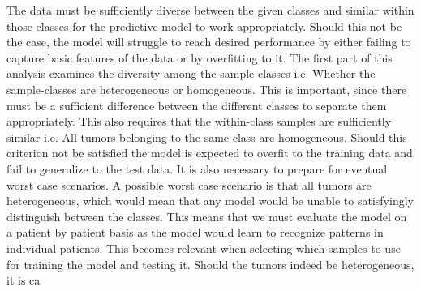 The data must be sufficiently diverse between the given classes and similar within those classes for the predictive model to work appropriately. Should this not be the case, the model will struggle to reach desired performance by either failing to capture basic features of the data or by overfitting to it. The first part of this analysis examines the diversity among the sample-classes i.e. Whether the sample-classes are heterogeneous or homogeneous. This is important, since there must be a sufficient difference between the different classes to separate them appropriately. This also requires that the within-class samples are sufficiently similar i.e. All tumors belonging to the same class are homogeneous. Should this criterion not be satisfied the model is expected to overfit to the training data and fail to generalize to the test data. It is also necessary to prepare for eventual worst case scenarios. A possible worst case scenario is that all tumors are heterogeneous, which would mean that any model would be unable to satisfyingly distinguish between the classes. This means that we must evaluate the model on a patient by patient basis as the model would learn to recognize patterns in individual patients. This becomes relevant when selecting which samples to use for training the model and testing it. Should the tumors indeed be heterogeneous, it is ca  
